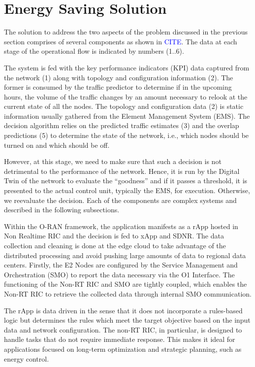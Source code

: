 \section{Energy Saving Solution}
\label{sec:solution}



The solution to address the two aspects of the problem discussed in the previous section comprises of several components as shown in \textcolor{blue}{CITE}. 
The data at each stage of the operational flow is indicated by numbers (1..6). 

The system is fed with the key performance indicators (KPI) data captured from the network (1) along with topology and configuration information (2). 
The former is consumed by the traffic predictor to determine if in the upcoming hours, the volume of the traffic changes by an amount necessary to relook at the current state of all the nodes. 
The topology and configuration data (2) is static information usually gathered from the Element Management System (EMS). 
The decision algorithm relies on the predicted traffic estimates (3) and the overlap predictions (5) to determine the state of the network, i.e., which nodes should be turned on and which should be off. 

However, at this stage, we need to make sure that such a decision is not detrimental to the performance of the network. 
Hence, it is run by the Digital Twin of the network to evaluate the “goodness” and if it passes a threshold, it is presented to the actual control unit, typically the EMS, for execution. 
Otherwise, we reevaluate the decision. Each of the components are complex systems and described in the following subsections.

Within the O-RAN framework, the application manifests as a rApp hosted in Non Realtime RIC and the decision is fed to xApp and SDNR. 
The data collection and cleaning is done at the edge cloud to take advantage of the distributed processing and avoid pushing large amounts of data to regional data centers.
Firstly, the E2 Nodes are configured by the Service Management and Orchestration (SMO) to report the data necessary via the O1 Interface. 
The functioning of the Non-RT RIC and SMO are tightly coupled, which enables the Non-RT RIC to retrieve the collected data through internal SMO communication. 

The rApp is data driven in the sense that it does not incorporate a rules-based logic but determines the rules which meet the target objective based on the input data and network configuration. 
The non-RT RIC, in particular, is designed to handle tasks that do not require immediate response. 
This makes it ideal for applications focused on long-term optimization and strategic planning, such as energy control. 

